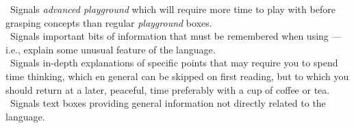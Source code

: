 \noindent
\advplayicon\ Signals \emph{advanced playground} which will require more time to play with before grasping concepts than regular \emph{playground} boxes.\\[1.5ex]

\noindent
\ilAttention\ Signals important bits of information that must be remembered when using \Rlang---i.e., explain some unusual feature of the language.\\[1.5ex]

\noindent
\ilAdvanced\ Signals in-depth explanations of specific points that may require you to spend time thinking, which en general can be skipped on first reading, but to which you should return at a later, peaceful, time preferably with a cup of coffee or tea.\\[1.5ex]

\noindent
\infoicon\ Signals text boxes providing general information not directly related to the \Rlang language.\\[1.5ex]

